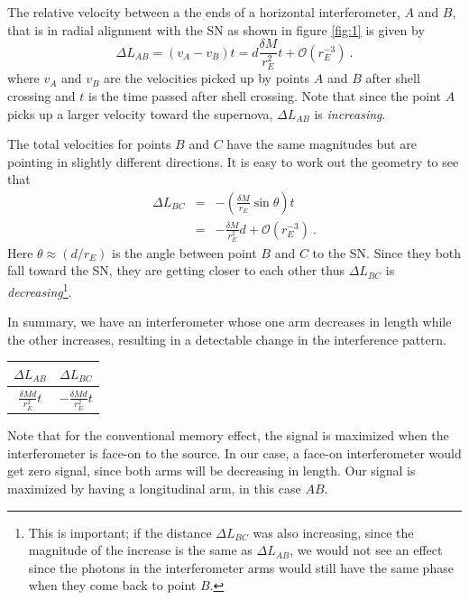 \documentclass[aps,showpacs,twocolumn,floats,prd,superscriptaddress,nofootinbib]{revtex4-1}
\begin{document}
 The relative velocity between a the ends of a horizontal interferometer, $A$ and $B$, that is in radial alignment with the SN as shown in figure \ref{fig:1} is given by
\begin{equation}
	\Delta L_{AB} =  (v_A - v_B)t = d \frac{\delta M}{r_E^2}  t+ \mathcal{O}(r_E^{-3})~.
\end{equation}
where $v_A$ and $v_B$ are the velocities picked up by points $A$ and $B$ after shell crossing and $t$ is the time passed after shell crossing. Note that since the point $A$ picks up a larger velocity toward the supernova, $\Delta L_{AB}$ is \emph{increasing}.

The total velocities for points $B$ and $C$ have the same magnitudes but are pointing in slightly different directions. It is easy to work out the geometry to see that
\begin{eqnarray}
	\Delta L_{BC} &=& -\left( \frac{ \delta M}{r_E} \sin \theta \right) t 
	\\ \nonumber
	&=& - \frac{\delta M}{r_E^2} d + \mathcal{O}(r_E^{-3})~.
\end{eqnarray}
Here $\theta\approx (d/r_E)$ is the angle between point $B$ and $C$ to the SN. Since they both fall toward the SN, they are getting closer to each other thus $\Delta L_{BC}$ is \emph{decreasing}\footnote{This is important; if the distance $\Delta L_{BC}$ was also increasing, since the magnitude of the increase is the same as $\Delta L_{AB}$, we would not see an effect since the photons in the interferometer arms would still have the same phase when they come back to point $B$.}.

In summary, we have an interferometer whose one arm decreases in length while the other increases, resulting in a detectable change in the interference pattern. 
\begin{center}
\begin{tabular}{| c | c |} 
\hline
$\Delta L_{AB}$ &  $  \Delta L_{BC} $  \\   \hline 
$\frac{\delta M d}{r_E^2} t$ & $ -\frac{\delta M d}{r_E^2} t$  \\ 
\hline 
\end{tabular}
\end{center}
Note that for the conventional memory effect, the signal is maximized when the interferometer is face-on to the source. In our case, a face-on interferometer would get zero signal, since both arms will be decreasing in length. Our signal is maximized by having a longitudinal arm, in this case $AB$.
\end{document}
